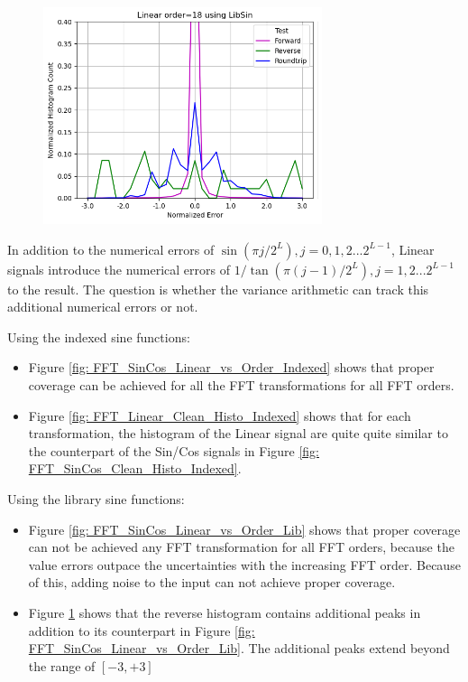 \documentclass[twoside]{article}
\numberwithin{equation}{section}
\begin{document}
\begin{figure}[p]
\centering
\includegraphics[height=2.5in]{FFT_Linear_Clean_Histo_Lib.png} 
\label{fig: FFT_Linear_Clean_Histo_Lib}
\end{figure}

In addition to the  numerical errors of $\sin(\pi j /2^L), j = 0, 1, 2 ... 2^{L-1}$, Linear signals introduce the numerical errors of $1/\tan(\pi (j - 1) /2^L), j = 1, 2 ... 2^{L-1}$ to the result.
The question is whether the variance arithmetic can track this additional numerical errors or not.

Using the indexed sine functions:
\begin{itemize}
\item Figure \ref{fig: FFT_SinCos_Linear_vs_Order_Indexed} shows that proper coverage can be achieved for all the FFT transformations for all FFT orders.

\item Figure \ref{fig: FFT_Linear_Clean_Histo_Indexed} shows that for each transformation, the histogram of the Linear signal are quite quite similar to the counterpart of the Sin/Cos signals in Figure \ref{fig: FFT_SinCos_Clean_Histo_Indexed}. 

\end{itemize}
 
Using the library sine functions:
\begin{itemize}
\item Figure \ref{fig: FFT_SinCos_Linear_vs_Order_Lib} shows that proper coverage can not be achieved any FFT transformation for all FFT orders, because the value errors outpace the uncertainties with the increasing FFT order.
Because of this, adding noise to the input can not achieve proper coverage.

\item Figure \ref{fig: FFT_Linear_Clean_Histo_Lib} shows that the reverse histogram contains additional peaks in addition to its counterpart in Figure \ref{fig: FFT_SinCos_Linear_vs_Order_Lib}.
The additional peaks extend beyond the range of $[-3, +3]$

\end{itemize}
\end{document}
